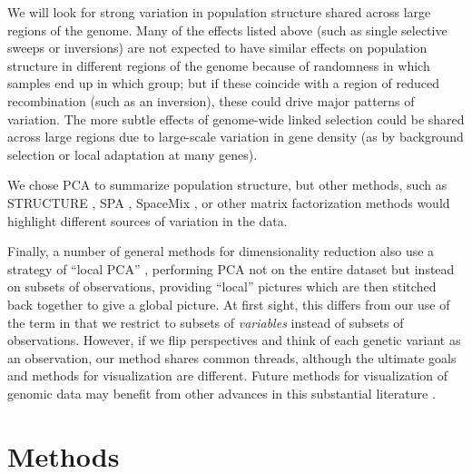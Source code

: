 \documentclass[11pt, oneside]{article}   	%
\begin{document}
We will look for strong variation in population structure shared across large regions of the genome.
Many of the effects listed above (such as single selective sweeps or inversions) 
are not expected to have similar effects on population structure in different regions of the genome
because of randomness in which samples end up in which group;
but if these coincide with a region of reduced recombination (such as an inversion),
these could drive major patterns of variation.
The more subtle effects of genome-wide linked selection could be shared across large regions
due to large-scale variation in gene density
(as by background selection or local adaptation at many genes).


We chose PCA to summarize population structure,
but other methods, such as STRUCTURE \citep{falush2003inference},
SPA \citep{yang2012modelbased},
SpaceMix \citep{bradburd2015spatial},
or other matrix factorization methods \citep{engelhardt2010analysis}
would highlight different sources of variation in the data.

Finally, a number of general methods for dimensionality reduction also use a strategy of ``local PCA''
\citep[e.g.][]{manjon2013diffusion,kambhatla1997dimension,weingessel2000local,roweis2000nonlinear},
performing PCA not on the entire dataset but instead on subsets of observations,
providing ``local'' pictures which are then stitched back together to give a global picture.
At first sight,
this differs from our use of the term in that we restrict to subsets of \emph{variables} instead of subsets of observations.
However, if we flip perspectives and think of each genetic variant as an observation,
our method shares common threads, although the ultimate goals and methods for visualization are different.
Future methods for visualization of genomic data
may benefit from other advances in this substantial literature 
\citep[reviewed in][]{vandermaaten2009dimensionality}.



\section{Methods}
\end{document}
